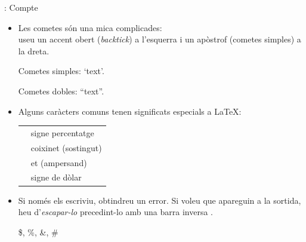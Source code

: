 \documentclass{beamer}
\begin{document}
\begin{frame}[fragile]{\insertsubsection{}: Compte}
\small
\begin{itemize}
\item Les cometes són una mica complicades:\\
useu un accent obert (\textit{backtick}) \keystroke{\`} a l'esquerra i un apòstrof (cometes simples)  a la dreta.
\begin{exampletwouptiny}
Cometes simples: `text'.

Cometes dobles: ``text''.
\end{exampletwouptiny}

\item Alguns caràcters comuns tenen significats especials a \LaTeX:\\[1ex]
\begin{tabular}{cl}
\keystrokebftt{\%} & signe percentatge         \\
\keystrokebftt{\#} & coixinet (sostingut)      \\
\keystrokebftt{\&} & et (ampersand)            \\
\keystrokebftt{\$} & signe de dòlar            \\
\end{tabular}
\item Si només els escriviu, obtindreu un error. 
    Si voleu que apareguin a la sortida, heu d'\textit{escapar-lo} precedint-lo amb una barra inversa \keystroke{\textbackslash}.
\begin{exampletwoup}
\$, \%, \&, \#
\end{exampletwoup}
\end{itemize}
\end{frame}
\end{document}

